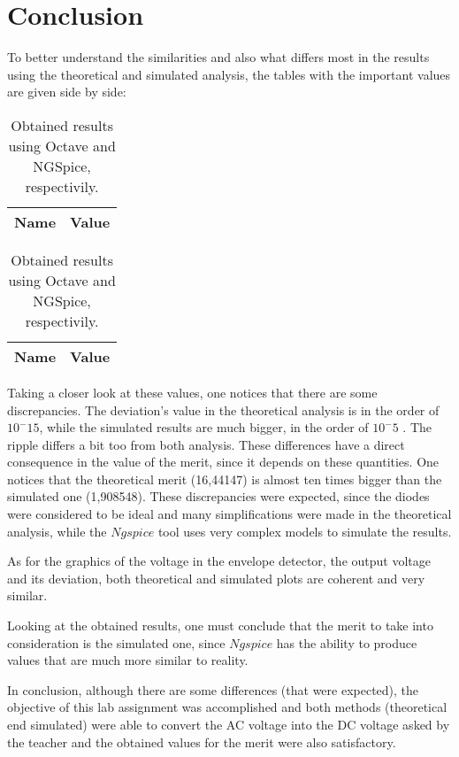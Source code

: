 \section{Conclusion}
\label{sec:conclusion}

\par To better understand the similarities and also what differs most in the results using the theoretical and simulated analysis, the tables with the important values are given side by side:


\begin{table}[h]
	\centering
	\begin{minipage}[t]{0.33\linewidth}
	 	 \begin{tabular}[t]{|l|r|}
	 	   \hline    
	 	   {\bf Name} & {\bf Value} \\ \hline
	 	   
	 	 \end{tabular}
	 	 \label{tab:rt2}
	\end{minipage}
	\begin{minipage}[t]{0.33\linewidth}
	  		\begin{tabular}[t]{|l|r|}
	    	\hline    
	   		{\bf Name} & {\bf Value} \\ \hline
	    	
	  		\end{tabular}
	  	\label{tab:rs2}
	\end{minipage}
	  	\caption{Obtained results using Octave and NGSpice, respectivily.}
\end{table}

\par Taking a closer look at these values, one notices that there are some discrepancies. The deviation's value in the theoretical analysis is in the order of $10^-15$, while the simulated results are much bigger, in the order of $10^-5$ . The ripple differs a bit too from both analysis. These differences have a direct consequence in the value of the merit, since it depends on these quantities. One notices that the theoretical merit (16,44147) is almost ten times bigger than the simulated one (1,908548). These discrepancies were expected, since the diodes were considered to be ideal and many simplifications were made in the theoretical analysis, while the $Ngspice$ tool uses very complex models to simulate the results.
\par As for the graphics of the voltage in the envelope detector, the output voltage and its deviation, both theoretical and simulated plots are coherent and very similar.
\par Looking at the obtained results, one must conclude that the merit to take into consideration is the simulated one, since $Ngspice$ has the ability to produce values that are much more similar to reality.
\par In conclusion, although there are some differences (that were expected), the objective of this lab assignment was accomplished and both methods (theoretical end simulated) were able to convert the AC voltage into the DC voltage asked by the teacher and the obtained values for the merit were also satisfactory.
